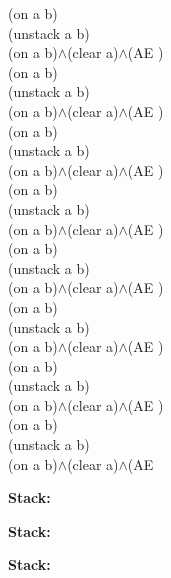 {{(on a b)\\
(unstack a b)\\
(on a b)$\wedge$(clear a)$\wedge$(AE )\\
(on a b)\\
(unstack a b)\\
(on a b)$\wedge$(clear a)$\wedge$(AE )\\
(on a b)\\
(unstack a b)\\
(on a b)$\wedge$(clear a)$\wedge$(AE )\\
(on a b)\\
(unstack a b)\\
(on a b)$\wedge$(clear a)$\wedge$(AE )\\
(on a b)\\
(unstack a b)\\
(on a b)$\wedge$(clear a)$\wedge$(AE )\\
(on a b)\\
(unstack a b)\\
(on a b)$\wedge$(clear a)$\wedge$(AE )\\
(on a b)\\
(unstack a b)\\
(on a b)$\wedge$(clear a)$\wedge$(AE )\\
(on a b)\\
(unstack a b)\\
(on a b)$\wedge$(clear a)$\wedge$(AE \item \textbf{Stack:}  \\ \noindent\fbox{%
\parbox{\textwidth}{%
}%
}

\item \textbf{Stack:}  \\ \noindent{}

\item \textbf{Stack:}  \\ \noindent{}

}}
